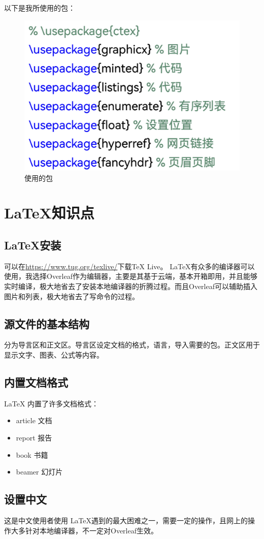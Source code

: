 \documentclass[fontset=ubuntu]{ctexart}
\begin{document}
以下是我所使用的包：
\begin{figure}[htb]
    \centering
    \includegraphics[width=0.5\linewidth]{Package.png}
    \caption{使用的包}
    \label{fig:Package}
\end{figure}

\section{ \LaTeX 知识点}

\subsection{ \LaTeX 安装}
可以在\url{https://www.tug.org/texlive/}下载TeX Live。 \LaTeX 有众多的编译器可以使用，我选择Overleaf作为编辑器，主要是其基于云端，基本开箱即用，并且能够实时编译，极大地省去了安装本地编译器的折腾过程。而且Overleaf可以辅助插入图片和列表，极大地省去了写命令的过程。

\subsection{源文件的基本结构}
分为导言区和正文区。导言区设定文档的格式，语言，导入需要的包。正文区用于显示文字、图表、公式等内容。

\subsection{内置文档格式}
 \LaTeX{} 内置了许多文档格式：
 \begin{itemize}
     \item article 文档
     \item report 报告
     \item book 书籍
     \item beamer 幻灯片
 \end{itemize}

\subsection{设置中文}
这是中文使用者使用 \LaTeX 遇到的最大困难之一，需要一定的操作，且网上的操作大多针对本地编译器，不一定对Overleaf生效。
\end{document}
